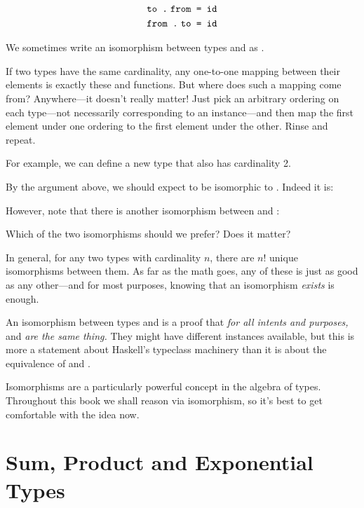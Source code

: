 \documentclass[book.tex]{subfiles}
\begin{document}
\begin{align*}
  \texttt{to .\;{}from = id} \\
  \texttt{from .\;{}to = id} \\
\end{align*}

We sometimes write an isomorphism between types  and  as .

If two types have the same cardinality, any one-to-one mapping between their
elements is exactly these  and  functions. But where does such a
mapping come from? Anywhere---it doesn't really matter! Just pick an arbitrary
ordering on each type---not necessarily corresponding to an 
instance---and then map the first element under one ordering to the first
element under the other. Rinse and repeat.

For example, we can define a new type that also has cardinality 2.


By the argument above, we should expect  to be isomorphic to .
Indeed it is:


However, note that there is another isomorphism between  and
:


Which of the two isomorphisms should we prefer? Does it matter?

In general, for any two types with cardinality $n$, there
are $n!$ unique isomorphisms between them. As far as the math goes, any of these
is just as good as any other---and for most purposes, knowing that an
isomorphism \emph{exists} is enough.

An isomorphism between types  and  is a proof that \emph{for all
intents and purposes,}  and  \emph{are the same thing.} They might
have different instances available, but this is more a statement about Haskell's
typeclass machinery than it is about the equivalence of  and .

Isomorphisms are a particularly powerful concept in the algebra of types.
Throughout this book we shall reason via isomorphism, so it's best to get
comfortable with the idea now.


\section{Sum, Product and Exponential Types}
\end{document}
